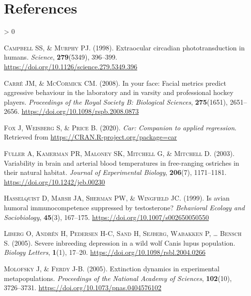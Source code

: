 \documentclass[
  a4paper,
]{article}
\newlength{\cslhangindent}
\newenvironment{CSLReferences}[2] %
 {%
  \setlength{\parindent}{0pt}
  \ifodd #1 \everypar{\setlength{\hangindent}{\cslhangindent}}\ignorespaces\fi
  \ifnum #2 > 0
  \setlength{\parskip}{#2\baselineskip}
  \fi
 }%
 {}
\begin{document}
\hypertarget{references}{%
\section*{References}\label{references}}

\hypertarget{refs}{}
\begin{CSLReferences}{1}{0}
\leavevmode\hypertarget{ref-Campbell1998}{}%
\textsc{Campbell SS, \& Murphy PJ}. (1998). Extraocular circadian phototransduction in humans. \emph{Science}, \textbf{279}(5349), 396--399. \url{https://doi.org/10.1126/science.279.5349.396}

\leavevmode\hypertarget{ref-carre2008}{}%
\textsc{Carré JM, \& McCormick CM}. (2008). In your face: Facial metrics predict aggressive behaviour in the laboratory and in varsity and professional hockey players. \emph{Proceedings of the Royal Society B: Biological Sciences}, \textbf{275}(1651), 2651--2656. \url{https://doi.org/10.1098/rspb.2008.0873}

\leavevmode\hypertarget{ref-R-car}{}%
\textsc{Fox J, Weisberg S, \& Price B}. (2020). \emph{Car: Companion to applied regression}. Retrieved from \url{https://CRAN.R-project.org/package=car}

\leavevmode\hypertarget{ref-Fuller2003}{}%
\textsc{Fuller A, Kamerman PR, Maloney SK, Mitchell G, \& Mitchell D}. (2003). Variability in brain and arterial blood temperatures in free-ranging ostriches in their natural habitat. \emph{Journal of Experimental Biology}, \textbf{206}(7), 1171--1181. \url{https://doi.org/10.1242/jeb.00230}

\leavevmode\hypertarget{ref-Hasselquist1999}{}%
\textsc{Hasselquist D, Marsh JA, Sherman PW, \& Wingfield JC}. (1999). Is avian humoral immunocompetence suppressed by testosterone? \emph{Behavioral Ecology and Sociobiology}, \textbf{45}(3), 167--175. \url{https://doi.org/10.1007/s002650050550}

\leavevmode\hypertarget{ref-liberg2005}{}%
\textsc{Liberg O, Andrén H, Pedersen H-C, Sand H, Sejberg, Wabakken P, \ldots{} Bensch S}. (2005). Severe inbreeding depression in a wild wolf {Canis} lupus population. \emph{Biology Letters}, \textbf{1}(1), 17--20. \url{https://doi.org/10.1098/rsbl.2004.0266}

\leavevmode\hypertarget{ref-Molofsky2005}{}%
\textsc{Molofsky J, \& Ferdy J-B}. (2005). Extinction dynamics in experimental metapopulations. \emph{Proceedings of the National Academy of Sciences}, \textbf{102}(10), 3726--3731. \url{https://doi.org/10.1073/pnas.0404576102}


\end{CSLReferences}
\end{document}
